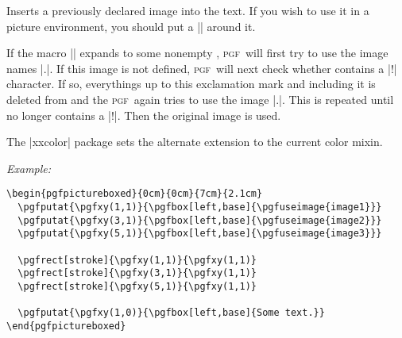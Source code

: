 \documentclass{ltxdoc}
\def\pgf{\textsc{pgf}}
\def\example{\par\smallskip\noindent\textit{Example: }}
\begin{document}
\begin{command}{\pgfuseimage{}}
  Inserts a previously declared image into the text. If you wish to
  use it in a picture environment, you should put a |\pgfbox|
  around it.

  If the macro |\pgfalternateextension| expands to some nonempty
  , \pgf\ will first try to use the image
  names |.|. If this
  image is not defined, \pgf\ will next check whether  contains a |!| character. If so, everythings up to this
  exclamation mark and including it is deleted from  and the \pgf\ again tries to use the image |.|. This is repeated until
   no longer contains a |!|. Then the
  original image is used.

  The |xxcolor| package sets the alternate extension to the current
  color mixin. 

  \example

\begin{verbatim}
\begin{pgfpictureboxed}{0cm}{0cm}{7cm}{2.1cm}
  \pgfputat{\pgfxy(1,1)}{\pgfbox[left,base]{\pgfuseimage{image1}}}
  \pgfputat{\pgfxy(3,1)}{\pgfbox[left,base]{\pgfuseimage{image2}}}
  \pgfputat{\pgfxy(5,1)}{\pgfbox[left,base]{\pgfuseimage{image3}}}

  \pgfrect[stroke]{\pgfxy(1,1)}{\pgfxy(1,1)}
  \pgfrect[stroke]{\pgfxy(3,1)}{\pgfxy(1,1)}
  \pgfrect[stroke]{\pgfxy(5,1)}{\pgfxy(1,1)}

  \pgfputat{\pgfxy(1,0)}{\pgfbox[left,base]{Some text.}}
\end{pgfpictureboxed}
\end{verbatim}


\begin{pgfpictureboxed}{0cm}{0cm}{7cm}{2.1cm}


\end{pgfpictureboxed}
\end{command}
\end{document}
